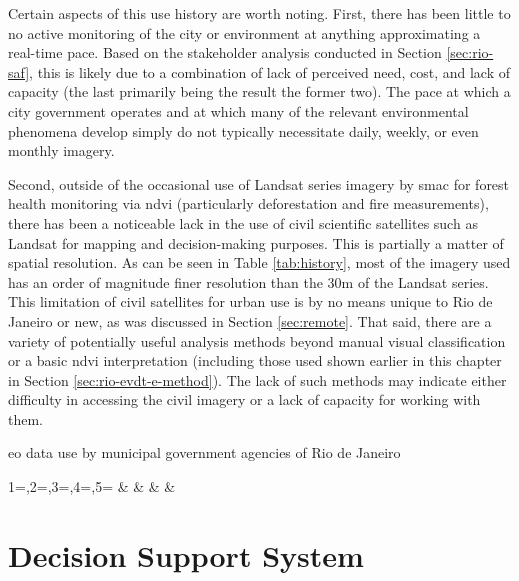 Certain aspects of this use history are worth noting. First, there has been little to no active monitoring of the city or environment at anything approximating a real-time pace. Based on the stakeholder analysis conducted in Section \ref{sec:rio-saf}, this is likely due to a combination of lack of perceived need, cost, and lack of capacity (the last primarily being the result the former two). The pace at which a city government operates and at which many of the relevant environmental phenomena develop simply do not typically necessitate daily, weekly, or even monthly imagery.

Second, outside of the occasional use of Landsat series imagery by \ac{smac} for forest health monitoring via \ac{ndvi} (particularly deforestation and fire measurements), there has been a noticeable lack in the use of civil scientific satellites such as Landsat for mapping and decision-making purposes. This is partially a matter of spatial resolution. As can be seen in Table \ref{tab:history}, most of the imagery used has an order of magnitude finer resolution than the 30m of the Landsat series. This limitation of civil satellites for urban use is by no means unique to Rio de Janeiro or new, as was discussed in Section \ref{sec:remote}. That said, there are a variety of potentially useful analysis methods beyond manual visual classification or a basic \ac{ndvi} interpretation (including those used shown earlier in this chapter in Section \ref{sec:rio-evdt-e-method}). The lack of such methods may indicate either difficulty in accessing the civil imagery or a lack of capacity for working with them.

\begin{table}[H]\centering
	\caption[EO data use by Rio de Janeiro]{\ac{eo} data use by municipal government agencies of Rio de Janeiro}\label{tab:history}
	\fontsize{8}{10}\selectfont
		{1=\year,2=\type,3=\platform,4=\agency,5=\primary}
		{\year & \type & \platform & \agency & \primary}
\end{table}


\section{Decision Support System} \label{sec:rio-dss}

